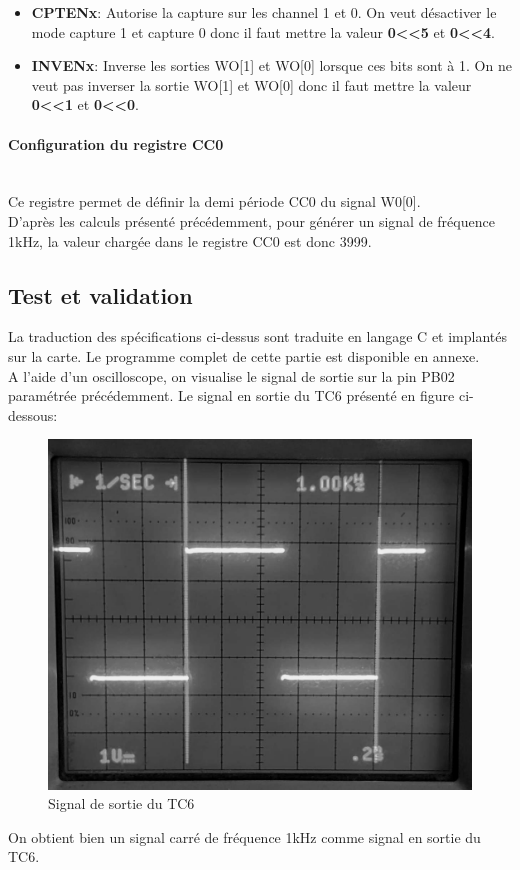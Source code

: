 \documentclass[a4paper]{article}
\begin{document}
	\begin{itemize}
		\item {\bf CPTENx}: Autorise la capture sur les channel 1 et 0. On veut désactiver le mode capture 1 et capture 0 donc il faut mettre la valeur {\bf 0\textless\textless5} et {\bf 0\textless\textless4}.~~\\
		\item {\bf INVENx}: Inverse les sorties WO[1] et WO[0] lorsque ces bits sont à 1. On ne veut pas inverser la sortie WO[1] et WO[0] donc il faut mettre la valeur {\bf 0\textless\textless1} et {\bf 0\textless\textless0}.~~\\
	\end{itemize}
	
	\paragraph{Configuration du registre CC0} 
	~~\\
	Ce registre permet de définir la demi période CC0 du signal W0[0]. \\
	D’après les calculs présenté précédemment, pour générer un signal de fréquence 1kHz, la valeur chargée dans le registre CC0 est donc 3999.\\
	
	\newpage 
	\subsection{Test et validation}
	La traduction des spécifications ci-dessus sont traduite en langage C et implantés sur la carte. Le programme complet de cette partie est disponible en annexe.\\
	A l’aide d’un oscilloscope, on visualise le signal de sortie sur la pin PB02 paramétrée précédemment. Le signal en sortie du TC6 présenté en figure ci-dessous:
	\begin{figure}[H]
		\centering
		\includegraphics[width=0.6\linewidth]{chrono_valide_etape2.jpg}
		\caption{Signal de sortie du TC6}
	\end{figure}
	On obtient bien un signal carré de fréquence 1kHz comme signal en sortie du TC6.
\end{document}
